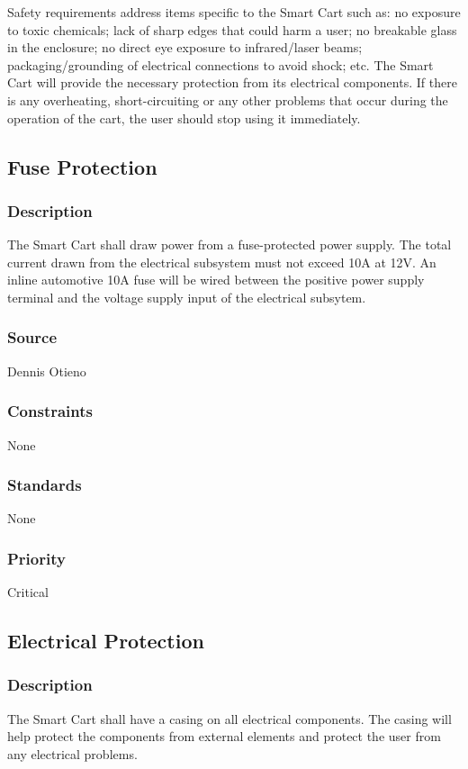 Safety requirements address items specific to the Smart Cart such as: no exposure to toxic chemicals; lack of sharp edges that could harm a user; no breakable glass in the enclosure; no direct eye exposure to infrared/laser beams; packaging/grounding of electrical connections to avoid shock; etc. The Smart Cart will provide the necessary protection from its electrical components. If there is any overheating, short-circuiting or any other problems that occur during the operation of the cart, the user should stop using it immediately. 

\subsection{Fuse Protection}
\subsubsection{Description}
The Smart Cart shall draw power from a fuse-protected power supply. The total current drawn from the electrical subsystem must not exceed 10A at 12V. An inline automotive 10A fuse will be wired between the positive power supply terminal and the voltage supply input of the electrical subsytem.
\subsubsection{Source}
Dennis Otieno
\subsubsection{Constraints}
None
\subsubsection{Standards}
None
\subsubsection{Priority}
Critical


\subsection{Electrical Protection}
\subsubsection{Description}
The Smart Cart shall have a casing on all electrical components. The casing will help protect the components from external elements and protect the user from any electrical problems.
